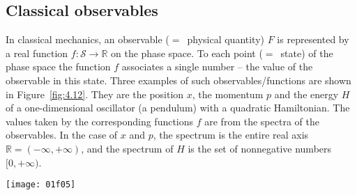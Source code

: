 \documentclass[nochecklpage]{stefan1}
\theoremstyle{definition}
\begin{document}
\vspace*{-3pt}
\subsection{Classical observables}\label{ss:observables}
\vspace*{-3pt}

In classical mechanics, an observable ($=$~physical quantity) $ F $ is
represented by a real function $ f: \mathcal{S} \to \mathbb{R} $ on the
phase space. To each point ($=$~state) of the phase space the function
$f$ associates a single number -- the value of the observable in this
state. Three examples of such observables/functions are shown in Figure~\ref{fig:4.12}. They are the position $ x $, the momentum $ p $ and the
energy $ H $ of a one-dimensional oscillator (a pendulum) with a
quadratic Hamiltonian. The values taken by the corresponding functions
$f$ are from the spectra of the observables. In the case of $ x $ and
$ p $, the spectrum is the entire real axis $ \mathbb{R} = (- \infty
, + \infty ) $, and the spectrum of $ H $ is the set of nonnegative
numbers $ [0, + \infty ) $.

\begin{SCfigure}[50][h]
\texttt{[image: 01f05]}
\caption{Observables in the language of propositions in the phase space: (a)
position $x$, (b) momentum $p$, (c) energy of the harmonic oscillator $H(x,p) =
p^{2}/(2m) + \alpha x^{2}$.}
\label{fig:4.12}
\end{SCfigure}
\end{document}
